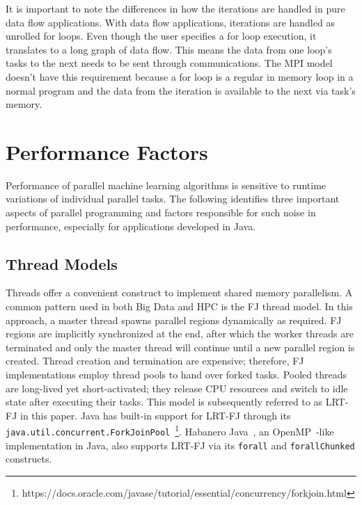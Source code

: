 \documentclass[10pt, conference, compsocconf]{IEEEtran}
\begin{document}
It is important to note the differences in how the iterations are handled in pure data flow applications. With data flow applications, iterations are handled as unrolled for loops. Even though the user specifies a for loop execution, it translates to a long graph of data flow. This means the data from one loop's tasks to the next needs to be sent through communications. The MPI model doesn't have this requirement because a for loop is a regular in memory loop in a normal program and the data from the iteration is available to the next via task's memory. 

\section{Performance Factors} \label{sec:factors}

Performance of parallel machine learning algorithms is sensitive to runtime variations of individual parallel tasks. The following identifies three important aspects of parallel programming and factors responsible for such noise in performance, especially for applications developed in Java.

\subsection{Thread Models}
Threads offer a convenient construct to implement shared memory parallelism. A common pattern used in both Big Data and \ac{HPC} is the \ac{FJ} thread model. In this approach, a master thread spawns parallel regions dynamically as required. \ac{FJ} regions are implicitly synchronized at the end, after which the worker threads are terminated and only the master thread will continue until a new parallel region is created. Thread creation and termination are expensive; therefore, \ac{FJ} implementations employ thread pools to hand over forked tasks. Pooled threads are long-lived yet short-activated; they release \acs{CPU} resources and switch to idle state after executing their tasks. This model is subsequently referred to as \ac{LRT-FJ} in this paper. Java has built-in support for \ac{LRT-FJ} through its \texttt{java.util.concurrent.ForkJoinPool}~\footnote{https://docs.oracle.com/javase/tutorial/essential/concurrency/forkjoin.html}. Habanero Java~\cite{Imam:2014:HLJ:2647508.2647514}, an OpenMP~\cite{Dagum:1998:OIA:615255.615542}-like implementation in Java, also supports \ac{LRT-FJ} via its \texttt{forall} and \texttt{forallChunked} constructs.
\end{document}

